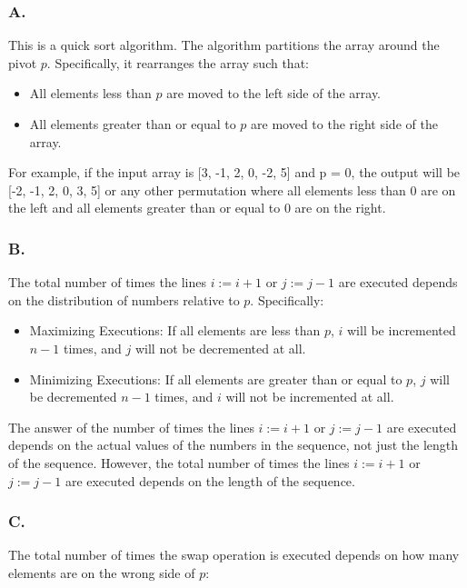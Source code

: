 \documentclass[titlepage]{article}\pagestyle{empty}
\begin{document}
\subsubsection*{A.} 
This is a quick sort algorithm. The algorithm partitions the array around the pivot $p$. Specifically, it rearranges the array such that:\\
\begin{itemize}
\item All elements less than $p$ are moved to the left side of the array.
\item All elements greater than or equal to $p$ are moved to the right side of the array.
\end{itemize}
For example, if the input array is [3, -1, 2, 0, -2, 5] and p = 0, the output will be [-2, -1, 2, 0, 3, 5] or any other permutation where all elements less than 0 are on the left and all elements greater than or equal to 0 are on the right.\\
\subsubsection*{B.} 
The total number of times the lines $i:=i+1$ or $j:=j-1$ are executed depends on the distribution of numbers relative to $p$. Specifically:\\

\begin{itemize}
\item Maximizing Executions: If all elements are less than $p$, $i$ will be incremented $n-1$ times, and $j$ will not be decremented at all.
\item Minimizing Executions: If all elements are greater than or equal to $p$, $j$ will be decremented $n-1$ times, and $i$ will not be incremented at all.
\end{itemize}

The answer of the number of times the lines $i:=i+1$ or $j:=j-1$ are executed depends on the actual values of the numbers in the sequence, not just the length of the sequence. However, the total number of times the lines $i:=i+1$ or $j:=j-1$ are executed depends on the length of the sequence.\\
\subsubsection*{C.} 
The total number of times the swap operation is executed depends on how many elements are on the wrong side of $p$:
\end{document}
